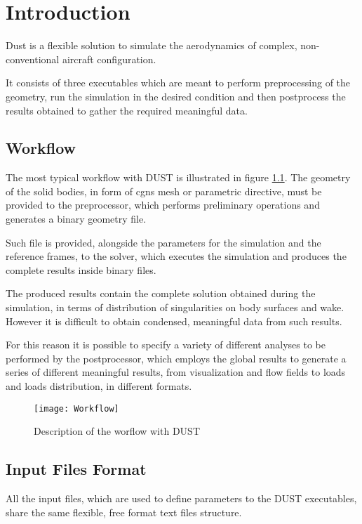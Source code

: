 \chapter{Introduction}

Dust is a flexible solution to simulate the aerodynamics of complex, non-conventional aircraft configuration.

It consists of three executables which are meant to perform preprocessing of the geometry, run the simulation in the desired condition and then postprocess the results obtained to gather the required meaningful data. 

\section{Workflow}
\label{sec:Workflow}

The most typical workflow with DUST is illustrated in figure \ref{fig:worflow}.  The geometry of the solid bodies, in form of cgns mesh or parametric directive, must be provided to the preprocessor, which performs preliminary operations and generates a binary geometry file. 

Such file is provided, alongside the parameters for the simulation and the reference frames, to the solver, which executes the simulation and produces the complete results inside binary files. 

The produced results contain the complete solution obtained during the simulation, in terms of distribution of singularities on body surfaces and wake. However it is difficult to obtain condensed, meaningful data from such results.

For this reason it is possible to specify a variety of different analyses to be performed by the postprocessor, which employs the global results to generate a series of different meaningful results, from visualization and flow fields to loads and loads distribution, in different formats.

\begin{figure}[h]
\centering
\texttt{[image: Workflow]}
\caption{Description of the worflow with DUST}
\label{fig:worflow}
\end{figure}



\section{Input Files Format}
\label{sec:InputFilesFormat}
All the input files, which are used to define parameters to the DUST executables, share the same flexible, free format text files structure.

